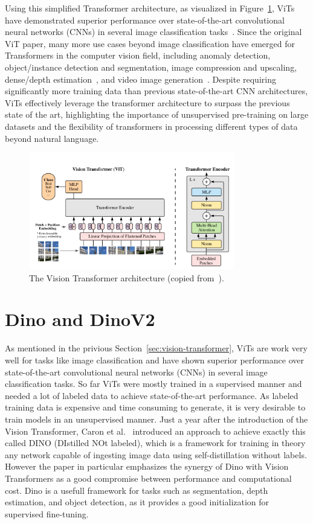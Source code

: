 Using this simplified Transformer architecture, as visualized in Figure~\ref{fig:vit}, ViTs have demonstrated superior performance over state-of-the-art convolutional neural networks (CNNs) in several image classification tasks~\cite{Mauricio2023}. 
Since the original ViT paper, many more use cases beyond image classification have emerged for Transformers in the computer vision field, including anomaly detection, object/instance detection and segmentation, image compression and upscaling, dense/depth estimation~\cite{Ranftl2021}, and video image generation~\cite{Jamil2023}. 
Despite requiring significantly more training data than previous state-of-the-art CNN architectures, ViTs effectively leverage the transformer architecture to surpass the previous state of the art, highlighting the importance of unsupervised pre-training on large datasets and the flexibility of transformers in processing different types of data beyond natural language.
\begin{figure}
    \centering
    \includegraphics[width=0.8\textwidth]{images/vit_overview.png}
    \caption[The Vision Transformer architecture]{The Vision Transformer architecture (copied from~\cite{Dosovitskiy2020}).}\label{fig:vit}
\end{figure}

\section{Dino and DinoV2}
As mentioned in the privious Section~\ref{sec:vision-transformer}, ViTs are work very well for tasks like image classification and have shown superior performance over state-of-the-art convolutional neural networks (CNNs) in several image classification tasks.
So far ViTs were mostly trained in a supervised manner and needed a lot of labeled data to achieve state-of-the-art performance.
As labeled training data is expensive and time consuming to generate, it is very desirable to train models in an unsupervised manner.
Just a year after the introduction of the Vision Transformer, Caron et al.~\cite{Caron2021} introduced an approach to achieve exactly this called DINO (DIstilled NOt labeled), which is a framework for training in theory any network capable of ingesting image data using self-distillation without labels.
However the paper in particular emphasizes the synergy of Dino with Vision Transformers as a good compromise between performance and computational cost.
Dino is a usefull framework for tasks such as segmentation, depth estimation, and object detection, as it provides a good initialization for supervised fine-tuning.


